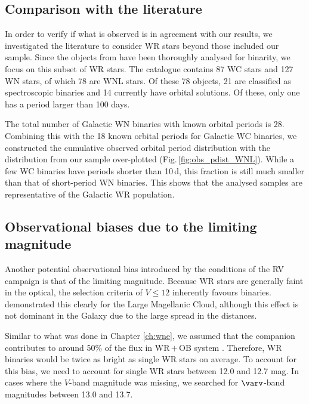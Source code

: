 \subsection{Comparison with the literature}  \label{sect:lit}
In order to verify if what is observed is in agreement with our results, we investigated the literature to consider WR stars beyond those included our sample. Since the objects from  have been thoroughly analysed for binarity, we focus on this subset of WR stars. The catalogue contains 87 WC stars and 127 WN stars, of which 78 are WNL stars. Of these 78 objects, 21 are classified as spectroscopic binaries and 14 currently have orbital solutions. Of these, only one has a period larger than 100 days.

The total number of Galactic WN binaries with known orbital periods is 28. Combining this with the 18 known orbital periods for Galactic WC binaries, we constructed the cumulative observed orbital period distribution with the distribution from our sample over-plotted (Fig.\,\ref{fig:obs_pdist_WNL}). While a few WC binaries have periods shorter than 10\,d, this fraction is still much smaller than that of short-period WN binaries. This shows that the analysed samples are representative of the Galactic WR population.
\subsection{Observational biases due to the limiting magnitude}  \label{sect:mag}
Another potential observational bias introduced by the conditions of the RV campaign is that of the limiting magnitude. Because WR stars are generally faint in the optical, the selection criteria of $V\le12$ inherently favours binaries. \citet{vanbeveren_binary_1980} demonstrated this clearly for the Large Magellanic Cloud, although this effect is not dominant in the Galaxy due to the large spread in the distances.

Similar to what was done in Chapter \ref{ch:wne}, we assumed that the companion contributes to around 50\% of the flux in WR\,$+$\,OB system \citep[e.g.,][]{shenar_wolf-rayet_2019}. Therefore, WR binaries would be twice as bright as single WR stars on average. To account for this bias, we need to account for single WR stars between 12.0 and 12.7 mag. In cases where the $V$-band magnitude was missing, we searched for $\varv$-band magnitudes between 13.0 and 13.7.

